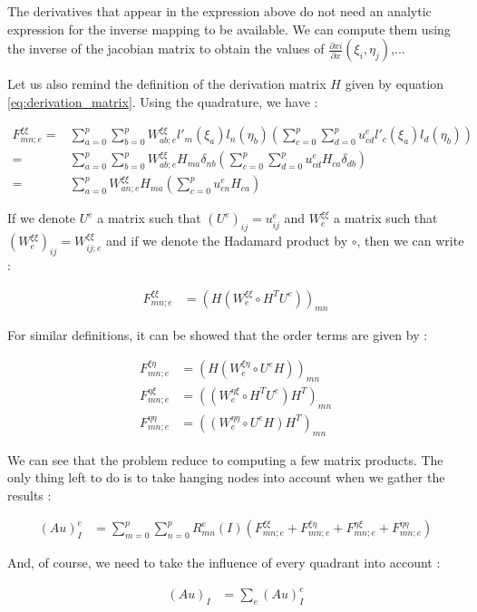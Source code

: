 The derivatives that appear in the expression above do not need an analytic expression for the inverse mapping to be available. We can compute them using the inverse of the jacobian matrix to obtain the values of $\frac{\partial xi}{\partial x}(\xi_i,\eta_j)$,...

Let us also remind the definition of the derivation matrix $H$ given by equation \ref{eq:derivation_matrix}. Using the quadrature, we have : 

\begin{align*}
F^{\xi\xi}_{mn;e} =& \sum_{a=0}^p\sum_{b=0}^p W^{\xi\xi}_{ab;e} l'_m(\xi_a)l_n(\eta_b)\left( \sum_{c=0}^p\sum_{d=0}^p u^e_{cd}l'_c(\xi_a)l_d(\eta_b)\right) \\
=& \sum_{a=0}^p\sum_{b=0}^p W^{\xi\xi}_{ab;e} H_{ma} \delta_{nb} \left( \sum_{c=0}^p\sum_{d=0}^p u^e_{cd}H_{ca}\delta_{db}\right) \\
=& \sum_{a=0}^p W_{an;e}^{\xi\xi}H_{ma}\left(\sum_{c=0}^p u^e_{cn}H_{ca}\right)
\end{align*}

If we denote $U^e$ a matrix such that $(U^e)_{ij} = u^e_{ij}$ and $W^{\xi\xi}_e$ a matrix such that $(W^{\xi\xi}_e)_{ij} = W^{\xi\xi}_{ij;e}$ and if we denote the Hadamard product by $\circ$,  then we can write : 

\begin{align*}
F^{\xi\xi}_{mn;e} &= \left( H(W_e^{\xi\xi} \circ H^TU^e)\right)_{mn}
\end{align*}

For similar definitions, it can be showed that the order terms are given by :  

\begin{align*}
F^{\xi\eta}_{mn;e} &= \left( H(W_e^{\xi\eta} \circ U^eH)\right)_{mn}\\
F^{\eta\xi}_{mn;e} &= \left( (W_e^{\eta\xi} \circ H^TU^e)H^T\right)_{mn}\\
F^{\eta\eta}_{mn;e} &= \left( (W_e^{\eta\eta} \circ U^eH)H^T\right)_{mn}
\end{align*}

We can see that the problem reduce to computing a few matrix products. The only thing left to do is to take hanging nodes into account when we gather the results : 

\begin{align*}
(Au)^e_I &= \sum_{m=0}^p\sum_{n=0}^p R^e_{mn}(I) \left(F_{mn;e}^{\xi\xi}+F_{mn;e}^{\xi\eta}+F_{mn;e}^{\eta\xi}+F_{mn;e}^{\eta\eta} \right)
\end{align*}

And, of course, we need to take the influence of every quadrant into account : 

\begin{align*}
(Au)_I &= \sum_e (Au)_I^e
\end{align*}



